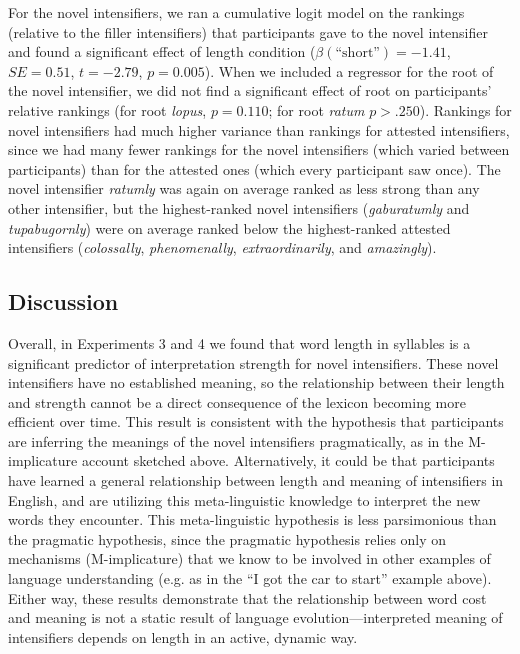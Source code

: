 \documentclass[10pt,letterpaper]{article}
\newcommand{\w}[1]{\emph{#1}}
\newcommand{\ndg}[1]{{\color{green}#1}}
\begin{document}
For the novel intensifiers, we ran a cumulative logit model on the rankings (relative to the filler intensifiers) that participants gave to the novel intensifier and found a significant effect of length condition ($\beta(\mbox{``short''})=-1.41$, $SE=0.51$, $t=-2.79$, $p=0.005$).
When we included a regressor for the root of the novel intensifier, we did not find a significant effect of root on participants' relative rankings (for root \w{lopus}, $p=0.110$; for root \w{ratum} $p>.250$).
Rankings for novel intensifiers had much higher variance than rankings for attested intensifiers, since we had many fewer rankings for the novel intensifiers (which varied between participants) than for the attested ones (which every participant saw once). The novel intensifier \w{ratumly} was again on average ranked as less strong than any other intensifier, but the highest-ranked novel intensifiers (\w{gaburatumly} and \w{tupabugornly}) were on average ranked below the highest-ranked attested intensifiers (\w{colossally}, \w{phenomenally}, \w{extraordinarily}, and \w{amazingly}).


\subsection{Discussion}
Overall, in Experiments 3 and 4 we found that word length in syllables is a significant predictor of interpretation strength for novel intensifiers. These novel intensifiers have no established meaning, so the relationship between their length and strength cannot be a direct consequence of the lexicon becoming more efficient over time. This result is consistent with the hypothesis that participants are inferring the meanings of the novel intensifiers pragmatically, as in the M-implicature account sketched above. 
Alternatively, it could be that participants have learned a general relationship between length and meaning of intensifiers in English, and are utilizing this meta-linguistic knowledge to interpret the new words they encounter. 
This meta-linguistic hypothesis is less parsimonious than the pragmatic hypothesis, since the pragmatic hypothesis relies only on mechanisms (M-implicature) that we know to be involved in other examples of language understanding (e.g. as in the ``I got the car to start'' example above).
Either way, these results demonstrate that the relationship between word cost and meaning is not a static result of language evolution---interpreted meaning of intensifiers depends on length in an active, dynamic way.
\end{document}
